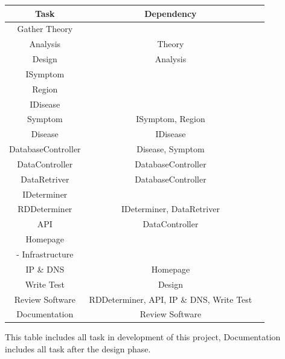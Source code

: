 \begin{center}
	\begin{tabular}[h]{|c|c|c|}
		\hline
		Task & Dependency \\ \hline
		Gather Theory & \\ \hline
		Analysis & Theory \\ \hline
		Design & Analysis \\ \hline
		ISymptom & \\ \hline
		Region &  \\ \hline
		IDisease &  \\ \hline
		Symptom & ISymptom, Region  \\ \hline
		Disease & IDisease \\ \hline
		DatabaseController & Disease, Symptom \\ \hline
		DataController & DatabaseController  \\ \hline
		DataRetriver & DatabaseController \\ \hline
		IDeterminer &  \\ \hline
		RDDeterminer & IDeterminer, DataRetriver \\ \hline
		API & DataController \\ \hline
		Homepage & \\ \hline-
		Infrastructure & \\ \hline
		IP \& DNS & Homepage  \\ \hline
		Write Test & Design \\ \hline
		Review Software & RDDeterminer, API, IP \& DNS, Write Test \\ \hline
		Documentation & Review Software \\ \hline
	\end{tabular}
\end{center}
This table includes all task in development of this project, Documentation includes all task after the design phase.

